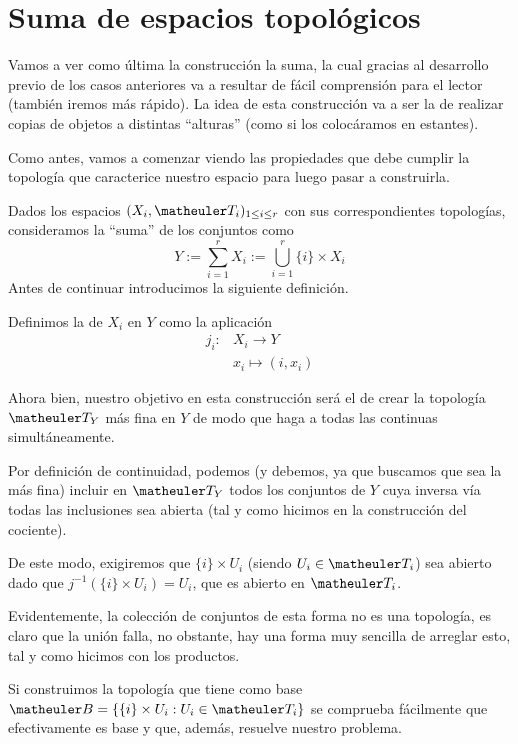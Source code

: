 \section{Suma de espacios topológicos}
Vamos a ver como última la construcción la suma, la cual gracias al desarrollo previo de los casos anteriores va a resultar de fácil comprensión para el lector (también iremos más rápido). La idea de esta construcción va a ser la de realizar copias de objetos a distintas ``alturas'' (como si los colocáramos en estantes). 

Como antes, vamos a comenzar viendo las propiedades que debe cumplir la topología que caracterice nuestro espacio para luego pasar a construirla.

Dados los espacios $(X_i, \T_i)_{1\le i \le r}$ con sus correspondientes topologías, consideramos la ``suma'' de los conjuntos como
\begin{equation}
 Y:=\sum_{i=1}^rX_i:=\bigcup_{i=1}^r\{i\}\times X_i
\end{equation}
Antes de continuar introducimos la siguiente definición.
\begin{defi}[Inclusiones]
	Definimos la  de $X_i$ en $Y$ como la aplicación
	\begin{equation}
		\begin{array}{cc}
		j_i: & X_i\to Y\\
		& x_i\mapsto (i,x_i)
		\end{array}
	\end{equation}
\end{defi}
Ahora bien, nuestro objetivo en esta construcción será el de crear la topología $\T_Y$ más fina en $Y$ de modo que haga a todas las continuas simultáneamente.

Por definición de continuidad, podemos (y debemos, ya que buscamos que sea la más fina) incluir en $\T_Y$ todos los conjuntos de $Y$ cuya inversa vía todas las inclusiones sea abierta (tal y como hicimos en la construcción del cociente).

De este modo, exigiremos que $\{i\}\times U_i$ (siendo $U_i\in\T_i$) sea abierto dado que $j^{-1}(\{i\}\times U_i)=U_i$, que es abierto en $\T_i$.

Evidentemente, la colección de conjuntos de esta forma no es una topología, es claro que la unión falla, no obstante, hay una forma muy sencilla de arreglar esto, tal y como hicimos con los productos.

Si construimos la topología que tiene como base $\B=\{\{i\}\times U_i:U_i\in\T_i\}$ se comprueba fácilmente que efectivamente es base y que, además, resuelve nuestro problema.

